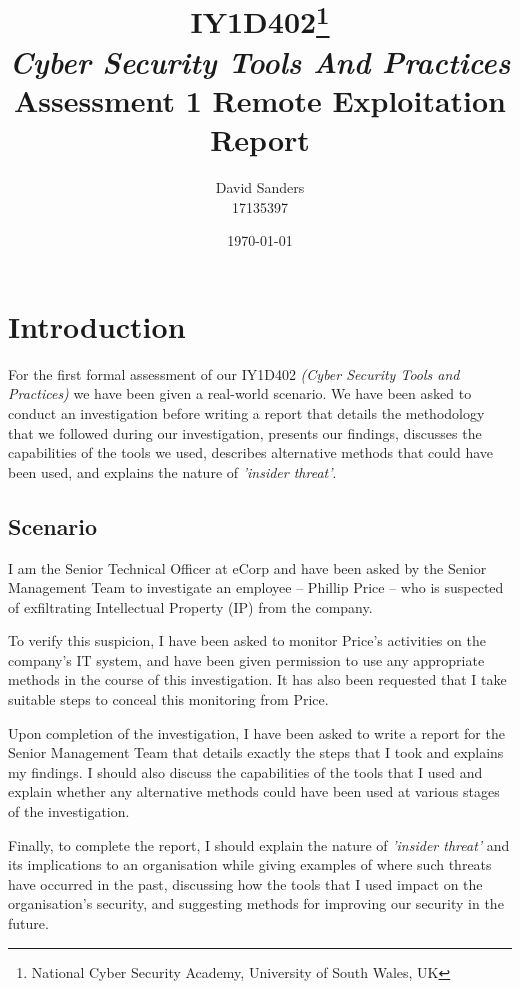 \documentclass[12pt]{report}
\title{IY1D402\thanks{National Cyber Security Academy, University of South Wales, UK}\\{\textit{\small Cyber Security Tools And Practices}}\\Assessment 1 Remote Exploitation Report}
\author{David Sanders\\{\LARGE 17135397}}
\date{\today}
\begin{document}
\maketitle
\pagebreak

\fontsize{11.5pt}{11.5pt}\selectfont
\tableofcontents
\fontsize{12pt}{12pt}\selectfont

\pagebreak
\chapter{Introduction}
For the first formal assessment of our IY1D402 \textit{(Cyber Security Tools and Practices)} we have been given a real-world scenario. We have been asked to conduct an investigation before writing a report that details the methodology that we followed during our investigation, presents our findings, discusses the capabilities of the tools we used, describes alternative methods that could have been used, and explains the nature of \textit{'insider threat'}.


\section{Scenario}
I am the Senior Technical Officer at eCorp and have been asked by the Senior Management Team to investigate an employee -- Phillip Price -- who is suspected of exfiltrating Intellectual Property (IP) from the company.

To verify this suspicion, I have been asked to monitor Price's activities on the company's IT system, and have been given permission to use any appropriate methods in the course of this investigation. It has also been requested that I take suitable steps to conceal this monitoring from Price.

Upon completion of the investigation, I have been asked to write a report for the Senior Management Team that details exactly the steps that I took and explains my findings. I should also discuss the capabilities of the tools that I used and explain whether any alternative methods could have been used at various stages of the investigation.

Finally, to complete the report, I should explain the nature of \textit{'insider threat'} and its implications to an organisation while giving examples of where such threats have occurred in the past, discussing how the tools that I used impact on the organisation's security, and suggesting methods for improving our security in the future.
\end{document}
